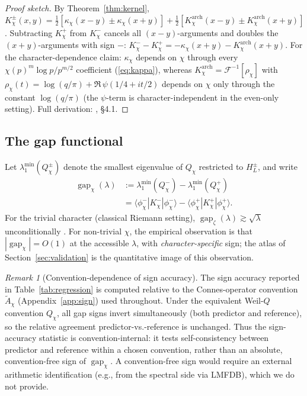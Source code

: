 \documentclass[10pt,twocolumn]{article}
\theoremstyle{definition}
\theoremstyle{remark}
\newtheorem{remark}[theorem]{Remark}
\newcommand{\gap}{\operatorname{gap}}
\newcommand{\chifn}{\chi}
\begin{document}
\begin{proof}[Proof sketch]
By Theorem~\ref{thm:kernel},
$K_\chi^\pm(x,y)=\frac{1}{2}[\kappa_\chi(x-y)\pm\kappa_\chi(x+y)]
+\frac{1}{2}[K^{\mathrm{arch}}_\chi(x-y)\pm K^{\mathrm{arch}}_\chi(x+y)]$.
Subtracting $K_\chi^+$ from $K_\chi^-$ cancels all $(x-y)$-arguments
and doubles the $(x+y)$-arguments with sign $-$:
$K_\chi^- - K_\chi^+ = -\kappa_\chi(x+y) - K^{\mathrm{arch}}_\chi(x+y)$.
For the character-dependence claim: $\kappa_\chi$ depends on
$\chifn$ through every $\chifn(p)^m\log p / p^{m/2}$ coefficient
(\eqref{eq:kappa}), whereas
$K^{\mathrm{arch}}_\chi=\mathcal{F}^{-1}[\rho_\chi]$ with
$\rho_\chi(t)=\log(q/\pi)+\Re\,\psi(1/4+it/2)$ depends on $\chifn$
only through the constant $\log(q/\pi)$ (the $\psi$-term is
character-independent in the even-only setting). Full derivation:
\cite{AnalyticKernel}, \S4.1.
\end{proof}

\subsection{The gap functional}

Let $\lambda_1^{\min}(Q_{\chifn}^\pm)$ denote the smallest eigenvalue
of $Q_{\chifn}$ restricted to $H_L^\pm$, and write
\begin{equation}
\label{eq:gap-def}
\begin{aligned}
  \gap_{\chifn}(\lambda)
    &:=\lambda_1^{\min}(Q_{\chifn}^-)
      -\lambda_1^{\min}(Q_{\chifn}^+)\\
    &=\langle\phi_{\chifn}^-|K_{\chifn}^-|\phi_{\chifn}^-\rangle
      -\langle\phi_{\chifn}^+|K_{\chifn}^+|\phi_{\chifn}^+\rangle.
\end{aligned}
\end{equation}
For the trivial character (classical Riemann setting), $\gap_\zeta
(\lambda)\gtrsim\sqrt{\lambda}$ unconditionally \cite{RH_II}. For
non-trivial $\chifn$, the empirical observation is that
$|\gap_{\chifn}|=O(1)$ at the accessible $\lambda$, with
\emph{character-specific} sign; the atlas of
Section~\ref{sec:validation} is the quantitative image of this
observation.

\begin{remark}[Convention-dependence of sign accuracy]
\label{rem:sign-convention-dependence}
The sign accuracy reported in Table~\ref{tab:regression} is computed
relative to the Connes-operator convention $\tilde{A}_\chi$
(Appendix~\ref{app:sign}) used throughout. Under the equivalent
Weil-$Q$ convention $Q_\chi$, all gap signs invert simultaneously
(both predictor and reference), so the relative agreement
predictor-vs.-reference is unchanged. Thus the sign-accuracy
statistic is convention-internal: it tests self-consistency between
predictor and reference within a chosen convention, rather than an
absolute, convention-free sign of $\gap_\chi$. A convention-free
sign would require an external arithmetic identification (e.g.,
from the spectral side via LMFDB), which we do not provide.
\end{remark}
\end{document}

